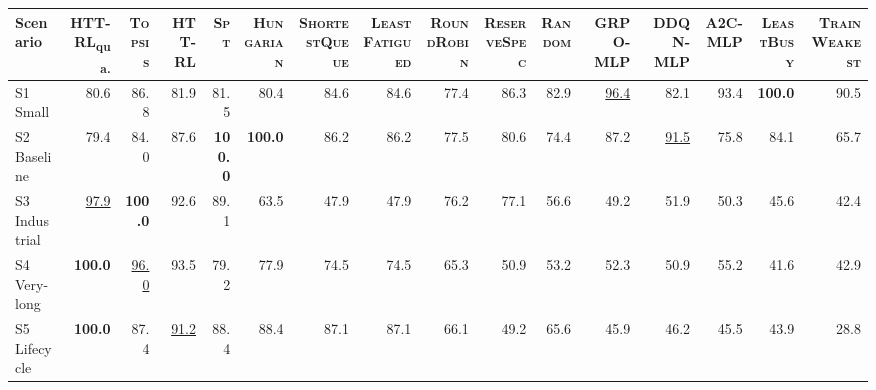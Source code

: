 \begin{tabular}{@{}lrrrrrrrrrrrrrrr@{}}
\toprule
Scenario & HTT-RL\textsubscript{qua.} & \textsc{Topsis} & HTT-RL & \textsc{Spt} & \textsc{Hungarian} & \textsc{ShortestQueue} & \textsc{LeastFatigued} & \textsc{RoundRobin} & \textsc{ReserveSpec} & \textsc{Random} & GRPO-MLP & DDQN-MLP & A2C-MLP & \textsc{LeastBusy} & \textsc{TrainWeakest} \\
\midrule
S1 Small & 80.6 & 86.8 & 81.9 & 81.5 & 80.4 & 84.6 & 84.6 & 77.4 & 86.3 & 82.9 & \underline{96.4} & 82.1 & 93.4 & \textbf{100.0} & 90.5 \\
S2 Baseline & 79.4 & 84.0 & 87.6 & \textbf{100.0} & \textbf{100.0} & 86.2 & 86.2 & 77.5 & 80.6 & 74.4 & 87.2 & \underline{91.5} & 75.8 & 84.1 & 65.7 \\
S3 Industrial & \underline{97.9} & \textbf{100.0} & 92.6 & 89.1 & 63.5 & 47.9 & 47.9 & 76.2 & 77.1 & 56.6 & 49.2 & 51.9 & 50.3 & 45.6 & 42.4 \\
S4 Very-long & \textbf{100.0} & \underline{96.0} & 93.5 & 79.2 & 77.9 & 74.5 & 74.5 & 65.3 & 50.9 & 53.2 & 52.3 & 50.9 & 55.2 & 41.6 & 42.9 \\
S5 Lifecycle & \textbf{100.0} & 87.4 & \underline{91.2} & 88.4 & 88.4 & 87.1 & 87.1 & 66.1 & 49.2 & 65.6 & 45.9 & 46.2 & 45.5 & 43.9 & 28.8 \\
\bottomrule
\end{tabular}
